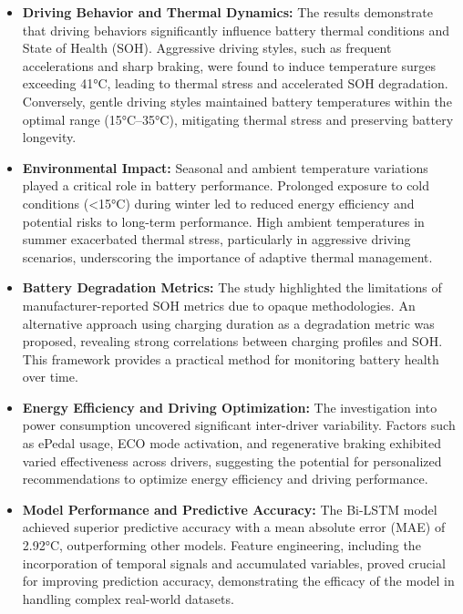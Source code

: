 \begin{itemize}

\item \textbf{Driving Behavior and Thermal Dynamics:}
The results demonstrate that driving behaviors significantly influence battery thermal conditions and State of Health (\gls{SOH}). 
Aggressive driving styles, such as frequent accelerations and sharp braking, were found to induce temperature surges exceeding 41°C, leading to thermal stress and accelerated \gls{SOH} degradation. 
Conversely, gentle driving styles maintained battery temperatures within the optimal range (15°C–35°C), mitigating thermal stress and preserving battery longevity.

\item \textbf{Environmental Impact:}
Seasonal and ambient temperature variations played a critical role in battery performance. 
Prolonged exposure to cold conditions (<15°C) during winter led to reduced energy efficiency and potential risks to long-term performance. 
High ambient temperatures in summer exacerbated thermal stress, particularly in aggressive driving scenarios, underscoring the importance of adaptive thermal management.

\item \textbf{Battery Degradation Metrics:}
The study highlighted the limitations of manufacturer-reported \gls{SOH} metrics due to opaque methodologies. 
An alternative approach using charging duration as a degradation metric was proposed, revealing strong correlations between charging profiles and \gls{SOH}. 
This framework provides a practical method for monitoring battery health over time.

\item \textbf{Energy Efficiency and Driving Optimization:}
The investigation into power consumption uncovered significant inter-driver variability. 
Factors such as ePedal usage, \gls{ECO} mode activation, and regenerative braking exhibited varied effectiveness across drivers, suggesting the potential for personalized recommendations to optimize energy efficiency and driving performance.

\item \textbf{Model Performance and Predictive Accuracy:}
The \gls{Bi-LSTM} model achieved superior predictive accuracy with a mean absolute error (\gls{MAE}) of 2.92°C, outperforming other models. 
Feature engineering, including the incorporation of temporal signals and accumulated variables, proved crucial for improving prediction accuracy, demonstrating the efficacy of the model in handling complex real-world datasets.


\end{itemize}
